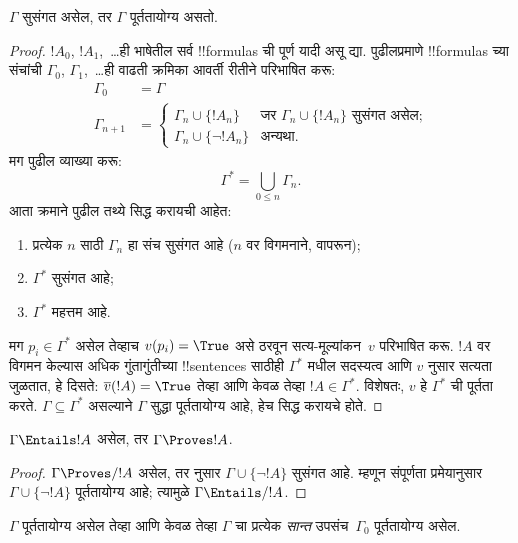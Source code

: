 \documentclass[../../../include/open-logic-section]{subfiles}
\begin{document}
\begin{thm}[संपूर्णता]
$\Gamma$ सुसंगत असेल, तर $\Gamma$ पूर्ततायोग्य असतो.
\end{thm}

\begin{proof}
$!A_0$, $!A_1$,~\dots ही भाषेतील सर्व !!{formula}s ची
पूर्ण यादी असू द्या. पुढीलप्रमाणे !!{formula}s च्या संचांची
$\Gamma_0$, $\Gamma_1$,~\dots ही वाढती क्रमिका
आवर्ती रीतीने परिभाषित करू:
\begin{align*}
\Gamma_0 & = \Gamma\\
\Gamma_{n+1} &  =
\begin{cases}
  \Gamma_n \cup \{!A_n\} & \text{जर $\Gamma_n \cup \{!A_n\}$ सुसंगत असेल;}\\
  \Gamma_n \cup \{\lnot !A_n\} & \text{अन्यथा}.
\end{cases}
\end{align*}
मग पुढील व्याख्या करू:
\[
\Gamma^* = \bigcup_{0\le n}\Gamma_n.
\]
आता क्रमाने पुढील तथ्ये सिद्ध करायची आहेत:
\begin{enumerate}
\item प्रत्येक $n$ साठी $\Gamma_n$ हा संच सुसंगत आहे
  ($n$ वर विगमनाने,  वापरून);
\item $\Gamma^*$ सुसंगत आहे;
\item $\Gamma^*$ महत्तम आहे.
\end{enumerate}
मग $p_i \in \Gamma^*$ असेल तेव्हाच $v(p_i) = \True$
असे ठरवून सत्य-मूल्यांकन~$v$ परिभाषित करू. $!A$ वर विगमन
केल्यास अधिक गुंतागुंतीच्या !!{sentence}s साठीही
$\Gamma^*$ मधील सदस्यत्व आणि $v$ नुसार सत्यता जुळतात,
हे दिसते: $\overline{v}(!A) = \True$ तेव्हा आणि केवळ तेव्हा
$!A \in \Gamma^*$. विशेषतः, $v$ हे $\Gamma^*$ ची पूर्तता
करते. $\Gamma \subseteq \Gamma^*$ असल्याने $\Gamma$
सुद्धा पूर्ततायोग्य आहे, हेच सिद्ध करायचे होते.
\end{proof}

\begin{cor}
$\Gamma \Entails !A$ असेल, तर $\Gamma \Proves !A$.
\end{cor}

\begin{proof}
$\Gamma\Proves/ !A$ असेल, तर  नुसार
$\Gamma \cup \{\lnot !A\}$ सुसंगत आहे. म्हणून संपूर्णता
प्रमेयानुसार $\Gamma \cup \{\lnot !A\}$ पूर्ततायोग्य आहे;
त्यामुळे $\Gamma \Entails/ !A$.
\end{proof}

\begin{prop}[संहतता प्रमेय]
$\Gamma$ पूर्ततायोग्य असेल तेव्हा आणि केवळ तेव्हा $\Gamma$ चा प्रत्येक
\emph{सान्त} उपसंच~$\Gamma_0$ पूर्ततायोग्य असेल.
\end{prop}
\end{document}
